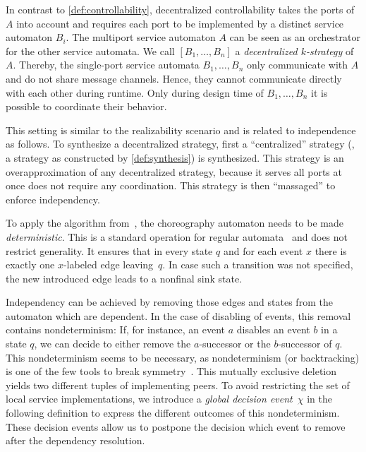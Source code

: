 In contrast to \autoref{def:controllability}, decentralized controllability takes the ports of~$A$ into account and requires each port to be implemented by a distinct service automaton $B_{i}$. The multiport service automaton $A$ can be seen as an orchestrator for the other service automata. We call $[B_{1},\ldots,B_{n}]$ a \emph{decentralized $k$-strategy} of $A$. Thereby, the single-port service automata $B_{1},\ldots,B_{n}$ only communicate with $A$ and do not share message channels. Hence, they cannot communicate directly with each other during runtime. Only during design time of $B_{1},\ldots,B_{n}$ it is possible to coordinate their behavior.

This setting is similar to the realizability scenario and is related to independence as follows. To synthesize a decentralized strategy, first a ``centralized'' strategy (\ie, a strategy as constructed by \autoref{def:synthesis}) is synthesized. This strategy is an overapproximation of any decentralized strategy, because it serves all ports at once does not require any coordination. This strategy is then ``massaged'' to enforce independency.

To apply the algorithm from~\citet{Wolf_2008_topnoc}, the choreography automaton needs to be made \emph{deterministic}. This is a standard operation for regular automata~\cite{HopcroftMU_1979} and does not restrict generality. It ensures that in every state $q$ and for each event $x$ there is exactly one $x$-labeled edge leaving~$q$. In case such a transition was not specified, the new introduced edge leads to a nonfinal sink state.

%

Independency can be achieved by removing those edges and states from the automaton which are dependent. In the case of disabling of events, this removal contains nondeterminism: If, for instance, an event $a$ disables an event $b$ in a state $q$, we can decide to either remove the $a$-successor or the $b$-successor of $q$. This nondeterminism seems to be necessary, as nondeterminism (or backtracking) is one of the few tools to break symmetry~\cite{Schmidt_2005_emisa}. This mutually exclusive deletion yields two different tuples of implementing peers. To avoid restricting the set of local service implementations, we introduce a \emph{global decision event}~$\chi$ in the following definition to express the different outcomes of this nondeterminism. These decision events allow us to postpone the decision which event to remove after the dependency resolution.

